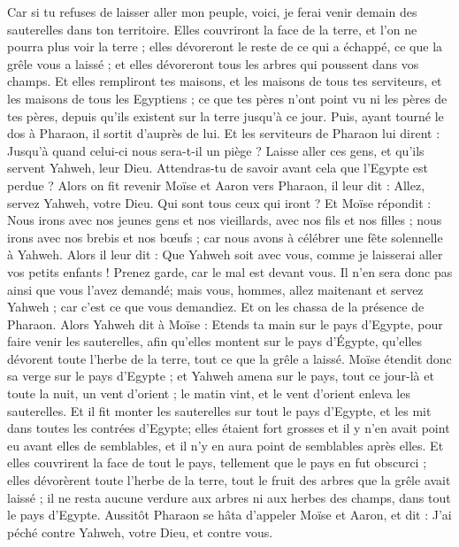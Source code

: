 \begin{multicols}{2}
Car si tu refuses de laisser aller mon peuple, voici, je ferai venir demain des sauterelles dans ton territoire.
Elles couvriront la face de la terre, et l'on ne pourra plus voir la terre ; elles dévoreront le reste de ce qui a échappé, ce que la grêle vous a laissé ; et elles dévoreront tous les arbres qui poussent dans vos champs.
Et elles rempliront tes maisons, et les maisons de tous tes serviteurs, et les maisons de tous les Egyptiens ; ce que tes pères n'ont point vu ni les pères de tes pères, depuis qu’ils existent sur la terre jusqu'à ce jour. Puis, ayant tourné le dos à Pharaon, il sortit d'auprès de lui.
Et les serviteurs de Pharaon lui dirent : Jusqu'à quand celui-ci nous sera-t-il un piège ? Laisse aller ces gens, et qu'ils servent Yahweh, leur Dieu. Attendras-tu de savoir avant cela que l'Egypte est perdue ?
Alors on fit revenir Moïse et Aaron vers Pharaon, il leur dit : Allez, servez Yahweh, votre Dieu. Qui sont tous ceux qui iront ?
 Et Moïse répondit : Nous irons avec nos jeunes gens et nos vieillards, avec nos fils et nos filles ; nous irons avec nos brebis et nos bœufs ; car nous avons à célébrer une fête solennelle à Yahweh.
Alors il leur dit : Que Yahweh soit avec vous, comme je laisserai aller vos petits enfants ! Prenez garde, car le mal est devant vous.
Il n'en sera donc pas ainsi que vous l'avez demandé; mais vous, hommes, allez maitenant et servez Yahweh ; car c'est ce que vous demandiez. Et on les chassa de la présence de Pharaon.
Alors Yahweh dit à Moïse : Etends ta main sur le pays d'Egypte, pour faire venir les sauterelles, afin qu'elles montent sur le pays d'Égypte, qu'elles dévorent toute l'herbe de la terre, tout ce que la grêle a laissé.
Moïse étendit donc sa verge sur le pays d'Egypte ; et Yahweh amena sur le pays, tout ce jour-là et toute la nuit, un vent d'orient ; le matin vint, et le vent d'orient enleva les sauterelles.
Et il fit monter les sauterelles sur tout le pays d'Egypte, et les mit dans toutes les contrées d'Egypte; elles étaient fort grosses et il y n'en  avait point eu avant elles de semblables, et il n'y en aura point de semblables après elles.
Et elles couvrirent la face de tout le pays, tellement que  le pays en fut obscurci ; elles dévorèrent toute l'herbe de la terre, tout le fruit des arbres que la grêle avait laissé ; il ne resta aucune verdure aux arbres ni aux herbes des champs, dans tout le pays d'Egypte.
Aussitôt Pharaon se hâta d'appeler Moïse et Aaron, et dit : J'ai péché contre Yahweh, votre Dieu, et contre vous.

\end{multicols}
